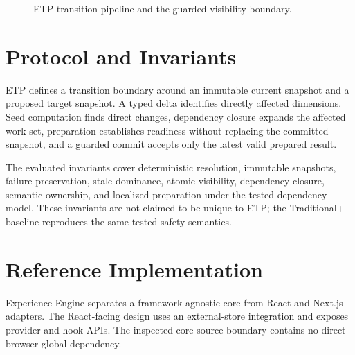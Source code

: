 \documentclass[manuscript]{acmart}
\begin{document}
\begin{figure}[t]
\centering
{}
\caption{ETP transition pipeline and the guarded visibility boundary.}
\label{fig:etp-pipeline}
\end{figure}

\section{Protocol and Invariants}
ETP defines a transition boundary around an immutable current snapshot and a proposed target
snapshot. A typed delta identifies directly affected dimensions. Seed computation finds direct
changes, dependency closure expands the affected work set, preparation establishes readiness
without replacing the committed snapshot, and a guarded commit accepts only the latest valid
prepared result.

The evaluated invariants cover deterministic resolution, immutable snapshots, failure
preservation, stale dominance, atomic visibility, dependency closure, semantic ownership,
and localized preparation under the tested dependency model. These invariants are not claimed
to be unique to ETP; the Traditional+ baseline reproduces the same tested safety semantics.

\section{Reference Implementation}
Experience Engine separates a framework-agnostic core from React and Next.js adapters.
The React-facing design uses an external-store integration and exposes provider and hook APIs.
The inspected core source boundary contains no direct browser-global dependency.
\end{document}
